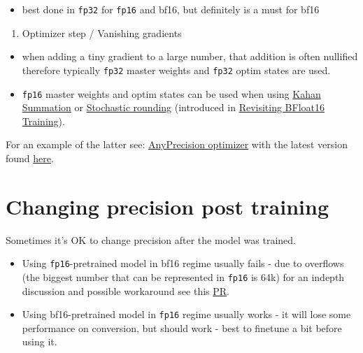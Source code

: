 \documentclass[
]{report}
\providecommand{\tightlist}{%
  \setlength{\itemsep}{0pt}\setlength{\parskip}{0pt}}\usepackage{longtable,booktabs,array}
\begin{document}
\begin{itemize}
\tightlist
\item
  best done in \texttt{fp32} for \texttt{fp16} and bf16, but definitely
  is a must for bf16
\end{itemize}

\begin{enumerate}
\def\labelenumi{\arabic{enumi}.}
\setcounter{enumi}{2}
\tightlist
\item
  Optimizer step / Vanishing gradients
\end{enumerate}

\begin{itemize}
\item
  when adding a tiny gradient to a large number, that addition is often
  nullified therefore typically \texttt{fp32} master weights and
  \texttt{fp32} optim states are used.
\item
  \texttt{fp16} master weights and optim states can be used when using
  \href{https://en.wikipedia.org/wiki/Kahan_summation_algorithm}{Kahan
  Summation} or \href{https://en.wikipedia.org/wiki/Rounding}{Stochastic
  rounding} (introduced in
  \href{https://arxiv.org/abs/2010.06192}{Revisiting BFloat16
  Training}).
\end{itemize}

For an example of the latter see:
\href{https://github.com/pytorch/torchdistx/pull/52}{AnyPrecision
optimizer} with the latest version found
\href{https://github.com/facebookresearch/multimodal/blob/6bf3779a064dc72cde48793521a5be151695fc62/torchmultimodal/modules/optimizers/anyprecision.py\#L17}{here}.

\section{Changing precision post
training}\label{changing-precision-post-training}

Sometimes it's OK to change precision after the model was trained.

\begin{itemize}
\item
  Using \texttt{fp16}-pretrained model in bf16 regime usually fails -
  due to overflows (the biggest number that can be represented in
  \texttt{fp16} is 64k) for an indepth discussion and possible
  workaround see this
  \href{https://github.com/huggingface/transformers/pull/10956}{PR}.
\item
  Using bf16-pretrained model in \texttt{fp16} regime usually works - it
  will lose some performance on conversion, but should work - best to
  finetune a bit before using it.
\end{itemize}
\end{document}

